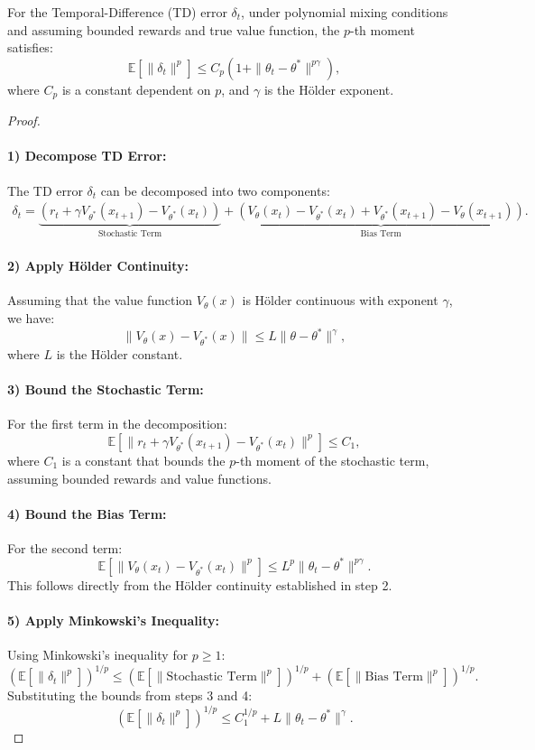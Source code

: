 \begin{lemma}
\label{lemma:ho-error-bounds}
For the Temporal-Difference (TD) error \( \delta_t \), under polynomial mixing conditions and assuming bounded rewards and true value function, the \( p \)-th moment satisfies:
\[
\mathbb{E}\left[\|\delta_t\|^p\right] \leq C_p \left( 1 + \|\theta_t - \theta^*\|^{p\gamma} \right),
\]
where \( C_p \) is a constant dependent on \( p \), and \( \gamma \) is the Hölder exponent.
\end{lemma}
\begin{proof}
\;\newline
\paragraph{1) Decompose TD Error:}  
The TD error \( \delta_t \) can be decomposed into two components:
\begin{align*}
\delta_t = \underbrace{(r_t + \gamma V_{\theta^*}(x_{t+1}) - V_{\theta^*}(x_t))}_{\text{Stochastic Term}} + \underbrace{(V_\theta(x_t) - V_{\theta^*}(x_t) + V_{\theta^*}(x_{t+1}) - V_\theta(x_{t+1}))}_{\text{Bias Term}}.
\end{align*}
\paragraph{2) Apply Hölder Continuity:}  
Assuming that the value function \( V_\theta(x) \) is Hölder continuous with exponent \( \gamma \), we have:
\[
\|V_\theta(x) - V_{\theta^*}(x)\| \leq L \|\theta - \theta^*\|^\gamma,
\]
where \( L \) is the Hölder constant.
\paragraph{3) Bound the Stochastic Term:}  
For the first term in the decomposition:
\[
\mathbb{E}\left[\|r_t + \gamma V_{\theta^*}(x_{t+1}) - V_{\theta^*}(x_t)\|^p\right] \leq C_1,
\]
where \( C_1 \) is a constant that bounds the \( p \)-th moment of the stochastic term, assuming bounded rewards and value functions.
\paragraph{4) Bound the Bias Term:}  
For the second term:
\[
\mathbb{E}\left[\|V_\theta(x_t) - V_{\theta^*}(x_t)\|^p\right] \leq L^p \|\theta_t - \theta^*\|^{p\gamma}.
\]
This follows directly from the Hölder continuity established in step 2.
\paragraph{5) Apply Minkowski's Inequality:}  
Using Minkowski's inequality for \( p \geq 1 \):
\[
\left( \mathbb{E}\left[\|\delta_t\|^p\right] \right)^{1/p} \leq \left( \mathbb{E}\left[ \| \text{Stochastic Term} \|^p \right] \right)^{1/p} + \left( \mathbb{E}\left[ \| \text{Bias Term} \|^p \right] \right)^{1/p}.
\]
Substituting the bounds from steps 3 and 4:
\[
\left( \mathbb{E}\left[\|\delta_t\|^p\right] \right)^{1/p} \leq C_1^{1/p} + L \|\theta_t - \theta^*\|^{\gamma}.
\]

\end{proof}
